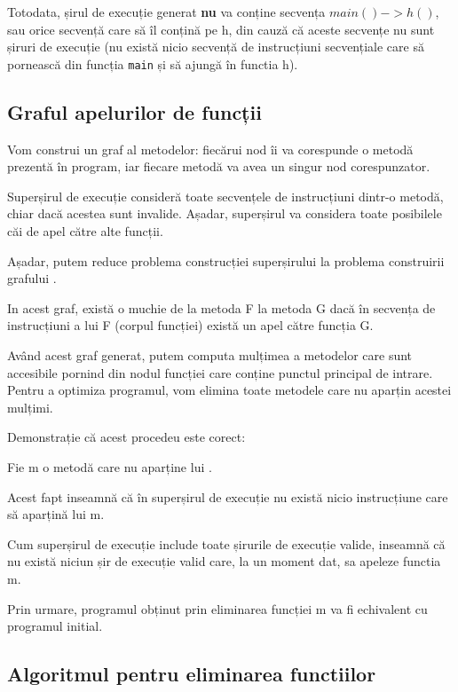 Totodata, șirul de execuție generat \textbf{nu} va conține
secvența \(main() -> h()\), sau orice secvență care să îl conțină
pe h, din cauză că aceste secvențe nu sunt șiruri de execuție
(nu există nicio secvență de instrucțiuni secvențiale
care să pornească din funcția \texttt{main} și să ajungă în
functia h).

\subsection{Graful apelurilor de funcții}\label{graful_apelurilor}

Vom construi un graf  al metodelor: fiecărui nod îi va
corespunde o metodă prezentă în program, iar fiecare metodă va
avea un singur nod corespunzator.

Superșirul de execuție consideră toate secvențele de instrucțiuni
dintr-o metodă, chiar dacă acestea sunt invalide.
Așadar, superșirul va considera toate  posibilele căi de apel către alte funcții.

Așadar, putem reduce problema construcției superșirului la
problema construirii grafului .

In acest graf, există o muchie de la metoda F la metoda
G dacă în secvența de instrucțiuni a lui F (corpul funcției)
există un apel către funcția G.

Având acest graf generat, putem computa mulțimea  a metodelor
care sunt accesibile pornind din nodul funcției care
conține punctul principal de intrare.
Pentru a optimiza programul, vom elimina toate metodele care nu
aparțin acestei mulțimi.

Demonstrație că acest procedeu este corect:
\begin{lemma}

	Fie m o metodă care nu aparține lui .

	Acest fapt inseamnă că în superșirul de execuție nu există nicio
	instrucțiune care să aparțină lui m.

	Cum superșirul de execuție include toate șirurile de execuție
	valide, inseamnă că nu există niciun șir de execuție valid care,
	la un moment dat, sa apeleze functia m.

	Prin urmare, programul obținut prin eliminarea funcției m va fi
	echivalent cu programul initial.
\end{lemma}

\subsection{Algoritmul pentru eliminarea
functiilor}\label{algoritm_naiv_pentru_eliminare}

